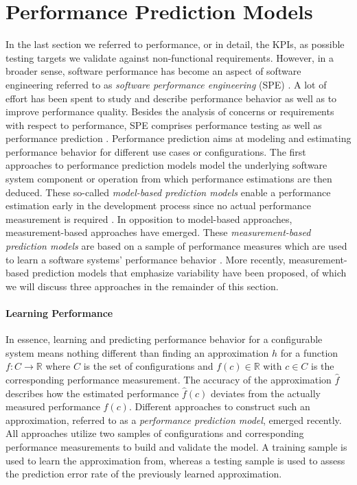 \section{Performance Prediction Models}
\label{sec:performance-prediction-models} 
In the last section we referred to performance, or in detail, the KPIs, as
possible testing targets we validate against non-functional requirements.
However, in a broader sense, software performance has become an aspect of
software engineering referred to as \emph{software performance engineering}
(SPE) \citep{woodside_future_2007}.
A lot of effort has been spent to study and describe performance behavior as well
as to improve performance quality. Besides the analysis of concerns or
requirements with respect to performance, SPE comprises performance testing as
well as performance prediction \citep{woodside_future_2007}. Performance
prediction aims at modeling and estimating performance behavior for different
use cases or configurations. The first approaches to performance prediction models model the underlying software system component or operation from which
performance estimations are then deduced. These so-called \emph{model-based prediction models} enable a
performance estimation early in the development process since no actual
performance measurement is required \citep{woodside_future_2007}. In opposition
to model-based approaches, measurement-based approaches have emerged. These \emph{measurement-based prediction models} are based on a sample of performance
measures which are used to learn a software systems’ performance behavior
\citep{woodside_future_2007}. More recently, measurement-based prediction models that emphasize variability have been
proposed, of which we will discuss three approaches in the remainder of
this section.

\paragraph{Learning Performance} In essence, learning and predicting performance
behavior for a configurable system means nothing different than finding an approximation $h$ for a function
$f: C \rightarrow \mathbb{R}$ where $C$ is the set of configurations and $f(c)
\in \mathbb{R}$ with $c \in C$ is the corresponding performance measurement. The
accuracy of the approximation $\hat{f}$ describes how the estimated performance
$\hat{f}(c)$ deviates from the actually measured performance $f(c)$. 
Different approaches to construct such an approximation, referred to as a
\emph{performance prediction model}, emerged recently. All approaches utilize
two samples of configurations and corresponding performance
measurements to build and validate the model. A training sample is used to
learn the approximation from, whereas a testing sample is used to assess the
prediction error rate of the previously learned approximation.

